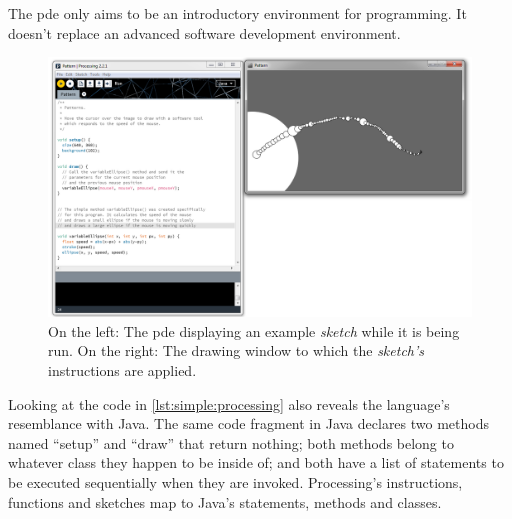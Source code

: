 \documentclass{./llncs2e/llncs}
\begin{document}
	The \ac{pde} only aims to be an introductory environment for programming. It doesn't replace an advanced software development environment.

	\begin{figure}
	  \centering
	  \includegraphics[width=1.0\textwidth]{img/proc_dev_env}
	    \caption{On the left: The \ac{pde} displaying an example \emph{sketch} while it is being run. On the right: The drawing window to which the \emph{sketch's} instructions are applied.}
	  \label{fig:proc:dev:env}
	\end{figure} 

	Looking at the code in \ref{lst:simple:processing} also reveals the language's resemblance with Java. The same code fragment in Java declares two methods named ``setup'' and ``draw'' that return nothing; both methods belong to whatever class they happen to be inside of; and both have a list of statements to be executed sequentially when they are invoked. Processing's instructions, functions and sketches map to Java's statements, methods and classes.

\end{document}

